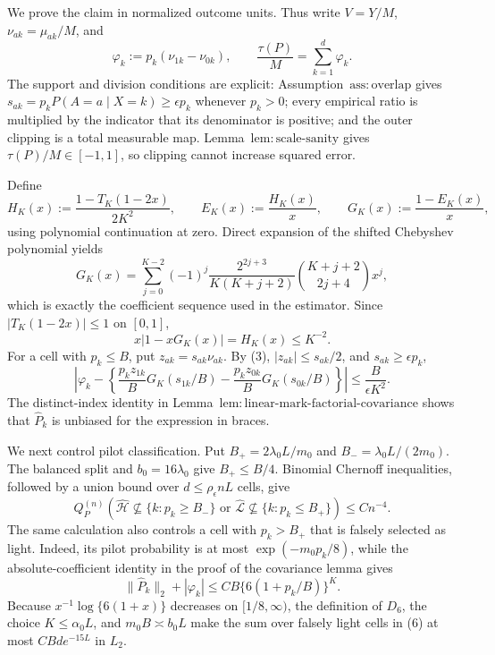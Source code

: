We prove the claim in normalized outcome units.  Thus write \(V=Y/M\), \(\nu_{ak}=\mu_{ak}/M\), and
\[
 \varphi_k:=p_k(\nu_{1k}-\nu_{0k}),\qquad
 \frac{\tau(P)}M=\sum_{k=1}^d\varphi_k.
\tag{1}
\]
The support and division conditions are explicit: Assumption~\(\mathrm{ass:overlap}\) gives \(s_{ak}=p_kP(A=a\mid X=k)\ge\epsilon p_k\) whenever \(p_k>0\); every empirical ratio is multiplied by the indicator that its denominator is positive; and the outer clipping is a total measurable map.  Lemma~\(\mathrm{lem:scale\text{-}sanity}\) gives \(\tau(P)/M\in[-1,1]\), so clipping cannot increase squared error.

Define
\[
 H_K(x):=\frac{1-T_K(1-2x)}{2K^2},\qquad
 E_K(x):=\frac{H_K(x)}x,\qquad
 G_K(x):=\frac{1-E_K(x)}x,
\]
using polynomial continuation at zero.  Direct expansion of the shifted Chebyshev polynomial yields
\[
 G_K(x)=\sum_{j=0}^{K-2}(-1)^j
 \frac{2^{2j+3}}{K(K+j+2)}\binom{K+j+2}{2j+4}x^j,
\tag{2}
\]
which is exactly the coefficient sequence used in the estimator.  Since \(|T_K(1-2x)|\le1\) on \([0,1]\),
\[
 x|1-xG_K(x)|=H_K(x)\le K^{-2}.
\tag{3}
\]
For a cell with \(p_k\le B\), put \(z_{ak}=s_{ak}\nu_{ak}\).  By (3), \(|z_{ak}|\le s_{ak}/2\), and \(s_{ak}\ge\epsilon p_k\),
\[
 \left|\varphi_k-\left\{\frac{p_kz_{1k}}B G_K(s_{1k}/B)-
 \frac{p_kz_{0k}}B G_K(s_{0k}/B)\right\}\right|
 \le\frac{B}{\epsilon K^2}.
\tag{4}
\]
The distinct-index identity in Lemma~\(\mathrm{lem:linear\text{-}mark\text{-}factorial\text{-}covariance}\) shows that \(\widehat P_k\) is unbiased for the expression in braces.

We next control pilot classification.  Put \(B_+=2\lambda_0L/m_0\) and \(B_-=\lambda_0L/(2m_0)\).  The balanced split and \(b_0=16\lambda_0\) give \(B_+\le B/4\).  Binomial Chernoff inequalities, followed by a union bound over \(d\le\rho_{\epsilon}nL\) cells, give
\[
 Q_P^{(n)}\!\left(\widehat{\mathcal H}\not\subseteq\{k:p_k\ge B_-\}
 \text{ or }\widehat{\mathcal L}\not\subseteq\{k:p_k\le B_+\}\right)
 \le Cn^{-4}.
\tag{5}
\]
The same calculation also controls a cell with \(p_k>B_+\) that is falsely selected as light.  Indeed, its pilot probability is at most \(\exp(-m_0p_k/8)\), while the absolute-coefficient identity in the proof of the covariance lemma gives
\[
 \|\widehat P_k\|_2+|\varphi_k|
 \le CB\{6(1+p_k/B)\}^{K}.
\tag{6}
\]
Because \(x^{-1}\log\{6(1+x)\}\) decreases on \([1/8,\infty)\), the definition of \(D_6\), the choice \(K\le\alpha_0L\), and \(m_0B\asymp b_0L\) make the sum over falsely light cells in (6) at most \(CBd e^{-15L}\) in \(L_2\).


